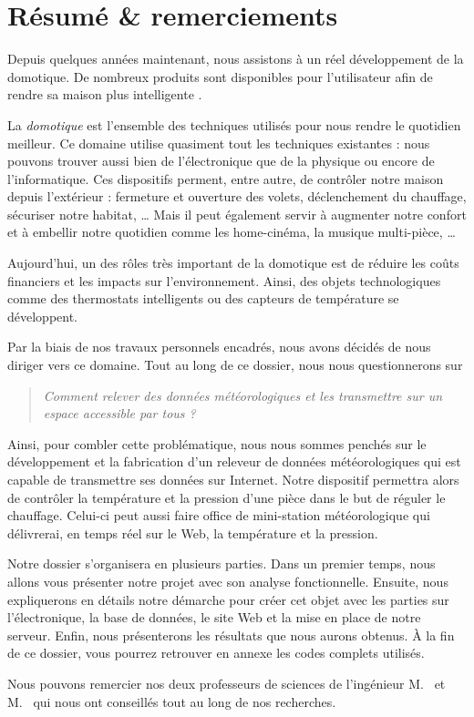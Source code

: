 \chapter*{Résumé \&{} remerciements}

Depuis quelques années maintenant, nous assistons à un réel développement de la domotique. De nombreux produits sont disponibles pour l'utilisateur afin de rendre sa maison plus \og intelligente \fg.

La \emph{domotique} est l'ensemble des techniques utilisés pour nous rendre le quotidien meilleur. Ce domaine utilise quasiment tout les techniques existantes : nous pouvons trouver aussi bien de l'électronique que de la physique ou encore de l'informatique. Ces dispositifs perment, entre autre, de contrôler notre maison depuis l'extérieur : fermeture et ouverture des volets, déclenchement du chauffage, sécuriser notre habitat, \dots{} Mais il peut également servir à augmenter notre confort et à embellir notre quotidien comme les home-cinéma, la musique multi-pièce, \dots

Aujourd'hui, un des rôles très important de la domotique est de réduire les coûts financiers et les impacts sur l'environnement. Ainsi, des objets technologiques comme des thermostats intelligents ou des capteurs de température se développent.

\Espace

Par la biais de nos travaux personnels encadrés, nous avons décidés de nous diriger vers ce domaine. Tout au long de ce dossier, nous nous questionnerons sur
\begin{quotation}
	\noindent\itshape Comment relever des données météorologiques et les transmettre sur un espace accessible par tous ?
\end{quotation}
Ainsi, pour combler cette problématique, nous nous sommes penchés sur le développement et la fabrication d'un releveur de données météorologiques qui est capable de transmettre ses données sur Internet. Notre dispositif permettra alors de contrôler la température et la pression d'une pièce dans le but de réguler le chauffage. Celui-ci peut aussi faire office de mini-station météorologique qui délivrerai, en temps réel sur le Web, la température et la pression.

Notre dossier s'organisera en plusieurs parties. Dans un premier temps, nous allons vous présenter notre projet avec son analyse fonctionnelle. Ensuite, nous expliquerons en détails notre démarche pour créer cet objet avec les parties sur l'électronique, la base de données, le site Web et la mise en place de notre serveur. Enfin, nous présenterons les résultats que nous aurons obtenus. À la fin de ce dossier, vous pourrez retrouver en annexe les codes complets utilisés.

\Espace

Nous pouvons remercier nos deux professeurs de sciences de l'ingénieur M.~ et M.~ qui nous ont conseillés tout au long de nos recherches.